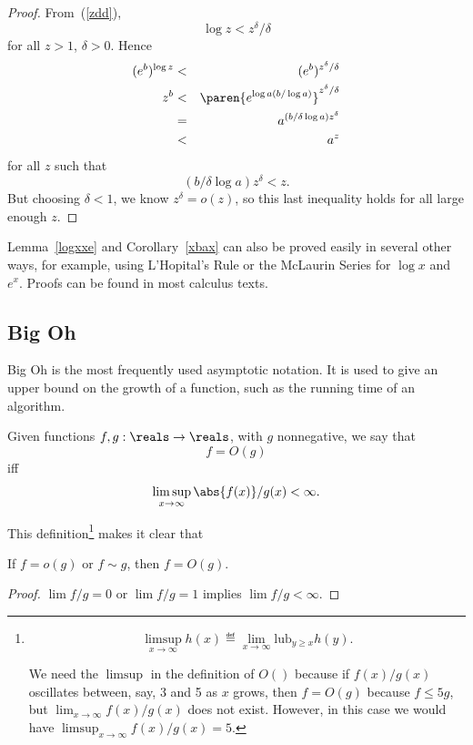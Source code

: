 \begin{proof}
From~(\ref{zdd}),
\[   %
\log z  <  z^{\delta}/\delta
\]   %
for all $z>1$, $\delta >0$.  
Hence
\begin{eqnarray*}
(e^b)^{\log z} & < & (e^b)^{z^{\delta}/\delta}\\ %
z^b & < & \paren{e^{\log a (b/\log a)}}^{z^{\delta}/\delta}\\ %
    & = & a^{(b/\delta\log a) z^{\delta}}\\ %
    & < & a^z  %
\end{eqnarray*}
for all $z$ such that
\[
(b/\delta\log a) z^{\delta} <z.
\]
But choosing $\delta < 1$, we know $z^{\delta} = o(z)$, so this last
inequality holds for all large enough $z$.
\end{proof}

Lemma~\ref{logxxe} and Corollary~\ref{xbax} can also be proved easily in
several other ways, for example, using L'Hopital's Rule or the McLaurin
Series for $\log x$ and $e^x$.  Proofs can be found in most calculus
texts.

\subsection{Big Oh}

Big Oh is the most frequently used asymptotic notation.  It is used to
give an upper bound on the growth of a function, such as the running
time of an algorithm.
\begin{definition}
Given functions $f, g : \reals \to \reals$, with $g$ nonnegative, we
say that
\[
f = O(g)
\]
iff
\[
\limsup_{x \rightarrow \infty} \abs{f(x)}/g(x) < \infty.
\]
\end{definition}
This definition\footnote{
\[
\limsup_{x \rightarrow \infty} h(x) \eqdef \lim_{x \rightarrow \infty}
\text{lub}_{y \geq x} h(y).
\]

\noindent We need the $\limsup$ in the definition of $O()$ because if $f(x)/g(x)$
oscillates between, say, 3 and 5 as $x$ grows, then $f = O(g)$ because $f
\leq 5g$, but $\lim_{x \rightarrow \infty} f(x)/g(x)$ does not exist.
However, in this case we would have $\limsup_{x \rightarrow \infty}
f(x)/g(x) = 5$.} makes it clear that
\begin{lemma}\label{osimO}
If $f = o(g)$ or $f \sim g$, then $f = O(g)$.
\end{lemma}
\begin{proof}
$\lim f/g=0$ or $\lim f/g=1$ implies $\lim f/g<\infty$.
\end{proof}

